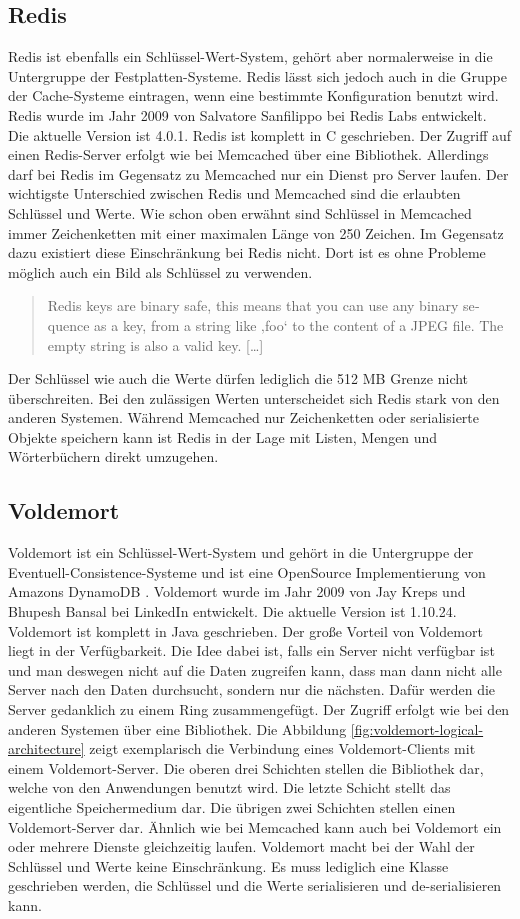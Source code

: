 \subsection{Redis}
Redis ist ebenfalls ein Schlüssel-Wert-System, gehört aber normalerweise in die
Untergruppe der Festplatten-Systeme. Redis lässt sich jedoch auch in die Gruppe
der Cache-Systeme eintragen, wenn eine bestimmte Konfiguration benutzt wird.
Redis wurde im Jahr 2009 von Salvatore Sanfilippo bei Redis Labs entwickelt.
Die aktuelle Version ist 4.0.1. Redis ist komplett in C geschrieben.
Der Zugriff auf einen Redis-Server erfolgt wie bei Memcached über eine Bibliothek.
Allerdings darf bei Redis im Gegensatz zu Memcached nur ein Dienst pro Server
laufen. Der wichtigste Unterschied zwischen Redis und Memcached sind die
erlaubten Schlüssel und Werte. Wie schon oben erwähnt sind Schlüssel in Memcached
immer Zeichenketten mit einer maximalen Länge von 250 Zeichen. Im Gegensatz dazu
existiert diese Einschränkung bei Redis nicht. Dort ist es ohne Probleme möglich
auch ein Bild als Schlüssel zu verwenden.

\foreignblockquote{english}[\cite{Redis2010}]{Redis keys are binary safe, this
means that you can use any binary sequence as a key, from a string like ‚foo‘
to the content of a JPEG file. The empty string is also a valid key. [\dots]}

Der Schlüssel wie auch die Werte dürfen lediglich die 512 MB Grenze nicht
überschreiten. Bei den zulässigen Werten unterscheidet sich Redis stark von den
anderen Systemen. Während Memcached nur Zeichenketten oder serialisierte Objekte
speichern kann ist Redis in der Lage mit Listen, Mengen und Wörterbüchern direkt
umzugehen.

\subsection{Voldemort}
Voldemort ist ein Schlüssel-Wert-System und gehört in die Untergruppe der
Eventuell-Consistence-Systeme und ist eine OpenSource Implementierung von
Amazons DynamoDB \cite{DeCandia2007}. Voldemort wurde im Jahr 2009 von Jay Kreps
und Bhupesh Bansal bei LinkedIn entwickelt. Die aktuelle Version ist 1.10.24.
Voldemort ist komplett in Java geschrieben. Der große Vorteil von Voldemort
liegt in der Verfügbarkeit. Die Idee dabei ist, falls ein Server nicht verfügbar
ist und man deswegen nicht auf die Daten zugreifen kann, dass man dann nicht
alle Server nach den Daten durchsucht, sondern nur die nächsten. Dafür werden die
Server gedanklich zu einem Ring zusammengefügt. Der Zugriff erfolgt wie bei den
anderen Systemen über eine Bibliothek. Die Abbildung \ref{fig:voldemort-logical-architecture}
zeigt exemplarisch die Verbindung eines Voldemort-Clients mit einem
Voldemort-Server. Die oberen drei Schichten stellen die Bibliothek dar, welche
von den Anwendungen benutzt wird. Die letzte Schicht stellt das eigentliche
Speichermedium dar. Die übrigen zwei Schichten stellen einen Voldemort-Server
dar. Ähnlich wie bei Memcached kann auch bei Voldemort ein oder mehrere Dienste
gleichzeitig laufen. Voldemort macht bei der Wahl der Schlüssel und Werte keine
Einschränkung. Es muss lediglich eine Klasse geschrieben werden, die Schlüssel
und die Werte serialisieren und de-serialisieren kann.

